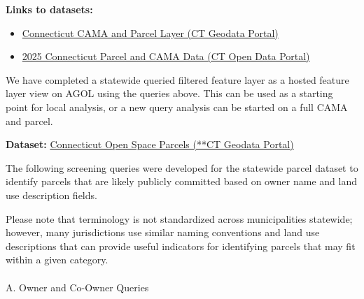 \documentclass[
  letterpaper,
  DIV=11,
  numbers=noendperiod]{scrreprt}
\makeatletter
\let\oldparagraph\paragraph
\renewcommand{\paragraph}{
    \@ifstar
      \xxxParagraphStar
      \xxxParagraphNoStar
  }
\newcommand{\xxxParagraphStar}[1]{\oldparagraph*{#1}\mbox{}}
\newcommand{\xxxParagraphNoStar}[1]{\oldparagraph{#1}\mbox{}}
\providecommand{\tightlist}{%
  \setlength{\itemsep}{0pt}\setlength{\parskip}{0pt}}
\makeatother
\begin{document}
\textbf{Links to datasets:}

\begin{itemize}
\tightlist
\item
  \href{https://geodata.ct.gov/datasets/ctmaps::connecticut-cama-and-parcel-layer/about}{Connecticut
  CAMA and Parcel Layer (CT Geodata Portal)}
\item
  \href{https://data.ct.gov/Local-Government/2025-Connecticut-Parcel-and-CAMA-Data/rny9-6ak2/about_data}{2025
  Connecticut Parcel and CAMA Data (CT Open Data Portal)}
\end{itemize}

We have completed a statewide queried filtered feature layer as a hosted
feature layer view on AGOL using the queries above. This can be used as
a starting point for local analysis, or a new query analysis can be
started on a full CAMA and parcel.

\textbf{Dataset:}
\href{https://ctmaps.maps.arcgis.com/home/item.html?id=8264f13efc0241798d6d1c821bffc2aa}{Connecticut
Open Space Parcels (**CT Geodata Portal)}

The following screening queries were developed for the statewide parcel
dataset to identify parcels that are likely publicly committed based on
owner name and land use description fields.

\begin{tcolorbox}[enhanced jigsaw, arc=.35mm, bottomrule=.15mm, breakable, colback=white, colframe=quarto-callout-note-color-frame, left=2mm, leftrule=.75mm, opacityback=0, rightrule=.15mm, toprule=.15mm]
\begin{minipage}[t]{5.5mm}
\textcolor{quarto-callout-note-color}{\faInfo}
\end{minipage}%
\begin{minipage}[t]{\textwidth - 5.5mm}

Please note that terminology is not standardized across municipalities
statewide; however, many jurisdictions use similar naming conventions
and land use descriptions that can provide useful indicators for
identifying parcels that may fit within a given category.

\end{minipage}%
\end{tcolorbox}

\paragraph{A. Owner and Co-Owner
Queries}\label{a.-owner-and-co-owner-queries}
\end{document}
